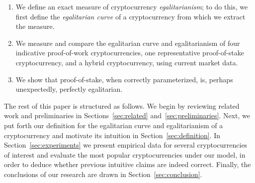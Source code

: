 \begin{enumerate}
  \item We define an exact measure of cryptocurrency
        \emph{egalitarianism}; to do this, we first define the \emph{egalitarian curve} of a
        cryptocurrency from which we extract the measure.
  \item We measure and compare the egalitarian curve and egalitarianism of
        four indicative proof-of-work cryptocurrencies, one representative
        proof-of-stake cryptocurrency, and a hybrid cryptocurrency, using
        current market data.
  \item We show that proof-of-stake, when correctly parameterized, is, perhaps unexpectedly, perfectly
        egalitarian.
\end{enumerate}

The rest of this paper is structured as follows. We begin by reviewing related
work and preliminaries in Sections~\ref{sec:related}
and~\ref{sec:preliminaries}. Next, we put forth our definition for the
egalitarian curve and egalitarianism of a cryptocurrency and motivate its
intuition in Section~\ref{sec:definition}. In Section~\ref{sec:experiments} we
present empirical data for several cryptocurrencies of interest and evaluate
the most popular cryptocurrencies under our model, in order to deduce whether
previous intuitive claims are indeed correct. Finally, the conclusions of our research
are drawn in Section~\ref{sec:conclusion}.
